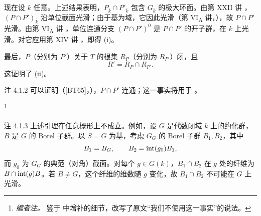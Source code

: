 现在设 \(k\) 任意。上述结果表明，\(P_{\bar k}\cap P'_{\bar k}\) 包含 \(G_{\bar k}\) 的极大环面。由第 XXII 讲 ，\((P\cap P')_{\bar k}\) 沿单位截面光滑；由于基为域，它因此光滑（第 VI\textsubscript{A} 讲，），故 \(P\cap P'\) 光滑。由第 VI\textsubscript{A} 讲 ，单位连通分支 \((P\cap P')^0\) 是 \(P\cap P'\) 的开子群，在 \(k\) 上光滑。对它应用第 XIV 讲 ，即得 (i)。

最后，\(P\)（分别为 \(P'\)）关于 \(T\) 的根集 \(R_P\)（分别为 \(R_{P'}\)）闭，且
\[
 R'=R_P\cap R_{P'}.
\]
这证明了 (ii)。
\SGAQED

\begin{sgastatement}{注 4.1.2}
可以证明（[BT65]，），\(P\cap P'\) 连通；这一事实将用于 。
\end{sgastatement}
\footnote{\emph{编者注。} 鉴于  中增补的细节，改写了原文“我们不使用这一事实”的说法。}

\begin{sgastatement}{注 4.1.3}
上述引理在任意概形上不成立。例如，设 \(G\) 是代数闭域 \(k\) 上的约化群，\(B\) 是 \(G\) 的 Borel 子群。以 \(S=G\) 为基，考虑 \(G_G\) 的 Borel 子群 \(B_1,B_2\)，其中
\[
 B_1=B_G,\qquad B_2=\operatorname{int}(g_0)B_1,
\]
而 \(g_0\) 为 \(G_G\) 的典范（对角）截面。对每个 \(g\in G(k)\)，\(B_1\cap B_2\) 在 \(g\) 处的纤维为 \(B\cap\operatorname{int}(g)B\)。若 \(B\ne G\)，这个纤维的维数随 \(g\) 变化，故 \(B_1\cap B_2\) 不可能在 \(G\) 上光滑。
\end{sgastatement}

